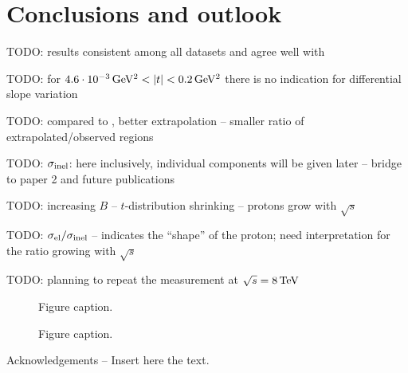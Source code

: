\documentclass[doublecol]{../macros/epl2}
\def\un#1{\,{\rm #1}}
\begin{document}
\section{Conclusions and outlook}

TODO: results consistent among all datasets and agree well with \cite{epl96}

TODO: for $4.6\cdot10^{-3}\un{GeV^2} < |t| < 0.2\un{GeV^2}$ there is no indication for differential slope variation

TODO: compared to \cite{epl96}, better extrapolation -- smaller ratio of extrapolated/observed regions

TODO: $\sigma_{\rm inel}$: here inclusively, individual components will be given later -- bridge to paper 2 and future publications

TODO: increasing $B$ -- $t$-distribution shrinking -- protons grow with $\sqrt s$

TODO: $\sigma_{\rm el} / \sigma_{\rm inel}$ -- indicates the ``shape'' of the proton; need interpretation for the ratio growing with $\sqrt s$

TODO: planning to repeat the measurement at $\sqrt s = 8\un{TeV}$



\begin{figure}
\caption{Figure caption.}
\label{fig.1}
\end{figure}

\begin{figure}
\caption{Figure caption.}
\label{fig.1}
\end{figure}




\acknowledgments
Acknowledgements -- Insert here the text.
\end{document}
